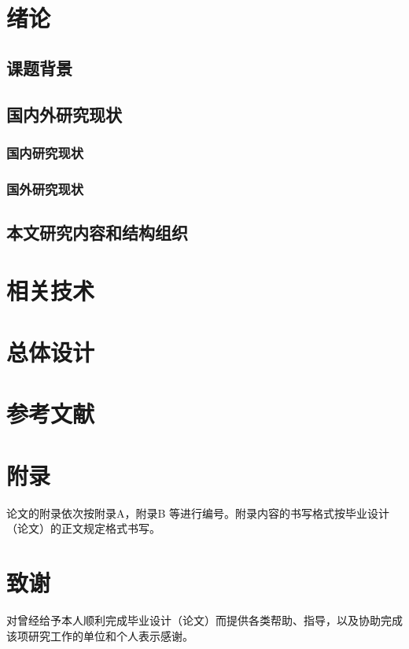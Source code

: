 \documentclass[UTF8，a4paper]{ctexrep}
\begin{document}

\chapter{绪论}{\heiti{}}
\thispagestyle{fancy}

  \section{课题背景}
  \section{国内外研究现状}
    \subsection{国内研究现状}
    \subsection{国外研究现状}
  \section{本文研究内容和结构组织}
\clearpage
\chapter{相关技术}{\heiti{}}
\thispagestyle{fancy}
\clearpage
\chapter{总体设计}{\heiti{}}
\thispagestyle{fancy}
\clearpage
{}
\chapter*{参考文献}{\heiti{}}
\thispagestyle{fancy}
\chapter*{附\qquad 录}{\heiti{}}
\thispagestyle{fancy}
论文的附录依次按附录A，附录B 等进行编号。附录内容的书写格式按毕业设计（论文）的正文规定格式书写。
\chapter*{致\qquad 谢}{\heiti{}}
\thispagestyle{fancy}
对曾经给予本人顺利完成毕业设计（论文）而提供各类帮助、指导，以及协助完成该项研究工作的单位和个人表示感谢。
\end{document}
